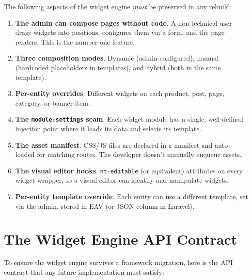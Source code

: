 \documentclass[11pt,a4paper]{article}
\begin{document}
\begin{keybox}
The following aspects of the widget engine \emph{must} be preserved
in any rebuild:

\begin{enumerate}[leftmargin=1.6em,itemsep=2pt]
  \item \textbf{The admin can compose pages without code}. A
        non-technical user drags widgets into positions, configures
        them via a form, and the page renders. This is the number-one feature.
  \item \textbf{Three composition modes}. Dynamic (admin-configured),
        manual (hardcoded placeholders in templates), and hybrid
        (both in the same template).
  \item \textbf{Per-entity overrides}. Different widgets on each
        product, post, page, category, or banner item.
  \item \textbf{The \texttt{module:settings} seam}. Each widget
        module has a single, well-defined injection point where it
        loads its data and selects its template.
  \item \textbf{The asset manifest}. CSS/JS files are declared in a
        manifest and auto-loaded for matching routes. The developer
        doesn't manually enqueue assets.
  \item \textbf{The visual editor hooks}. \texttt{nt-editable} (or
        equivalent) attributes on every widget wrapper, so a visual
        editor can identify and manipulate widgets.
  \item \textbf{Per-entity template override}. Each entity can use a
        different template, set via the admin, stored in EAV (or
        JSON column in Laravel).
\end{enumerate}
\end{keybox}

\section{The Widget Engine API Contract}\label{sec:api-contract}

To ensure the widget engine survives a framework migration, here is
the API contract that any future implementation must satisfy:
\end{document}
